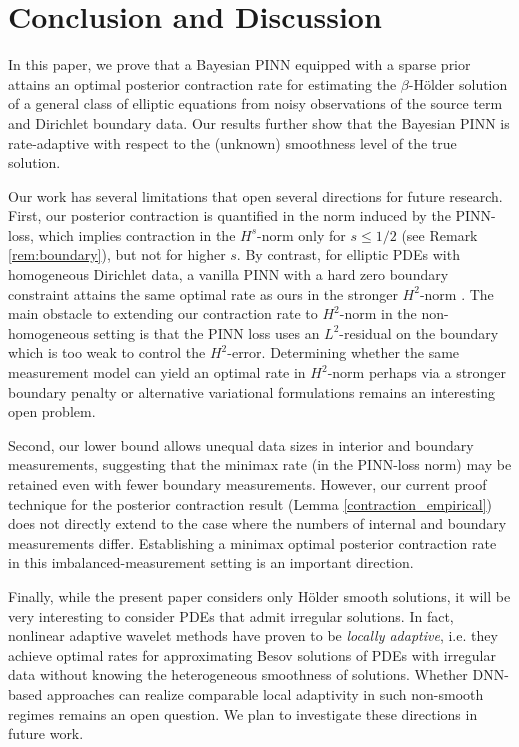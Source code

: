 \documentclass{article}
\theoremstyle{plain}
\theoremstyle{definition}
\theoremstyle{remark}
\begin{document}
\section{Conclusion and Discussion}
In this paper, we prove that a Bayesian PINN equipped with a sparse prior attains an optimal posterior contraction rate for estimating the $\beta$-H\"older solution of a general class of elliptic equations from noisy observations of the source term and Dirichlet boundary data. Our results further show that the Bayesian PINN is rate-adaptive with respect to the (unknown) smoothness level of the true solution. 

Our work has several limitations  that open several directions for future research. First, our posterior contraction is quantified in the norm induced by the PINN-loss, which implies contraction in the $H^{s}$-norm only for $s\leq 1/2$ (see Remark \ref{rem:boundary}), but not for higher $s$. By contrast, for elliptic PDEs with homogeneous Dirichlet data, a vanilla PINN with a hard zero boundary constraint attains the same optimal rate as ours in the stronger $H^2$-norm   \cite{lu2021machine}. The main obstacle to extending our contraction rate to $H^2$-norm in the non-homogeneous setting is that the PINN loss uses an $L^2$-residual on the boundary which is too weak to control the $H^2$-error.  Determining whether the same measurement model can yield an optimal rate in $H^2$-norm perhaps via a stronger boundary penalty or alternative variational formulations remains an interesting open problem. 

Second, our lower bound allows unequal  data sizes in interior and boundary  measurements, suggesting that the minimax rate (in the PINN-loss norm) may be retained even with fewer boundary measurements. However, our current proof technique for the posterior contraction result (Lemma \ref{contraction_empirical}) does not directly extend to the case where the numbers of internal  and  boundary measurements differ. Establishing a minimax optimal posterior contraction rate in this imbalanced-measurement setting is an important direction. 

Finally, while the present paper considers only H\"older smooth solutions, it will  be very interesting to consider PDEs that admit irregular solutions. In fact, nonlinear adaptive wavelet methods have proven \cite{binev2004adaptive,cascon2008quasi,devore1998nonlinear,devore2002adaptive,cohen2001adaptive,dahmen2002adaptive} to be  \emph{locally adaptive}, i.e. they achieve optimal rates for approximating Besov solutions of  PDEs with irregular data without knowing the heterogeneous smoothness of solutions. Whether DNN-based approaches can realize comparable local adaptivity in such non-smooth regimes remains an open question. We plan to investigate these directions in future work.  
\end{document}
